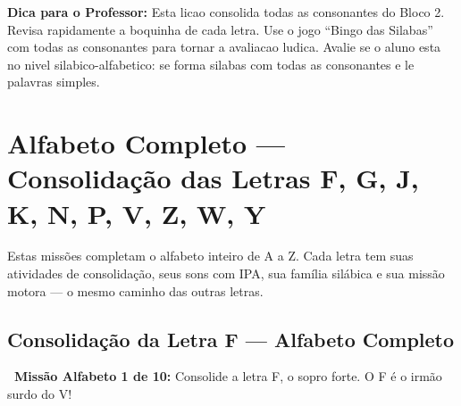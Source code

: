 \begin{dica}
\textbf{Dica para o Professor:} Esta licao consolida todas as consonantes do Bloco 2. Revisa rapidamente a boquinha de cada letra. Use o jogo ``Bingo das Silabas'' com todas as consonantes para tornar a avaliacao ludica. Avalie se o aluno esta no nivel silabico-alfabetico: se forma silabas com todas as consonantes e le palavras simples.
\end{dica}



\section{Alfabeto Completo --- Consolida\c{c}\~a{}o das Letras F, G, J, K, N, P, V, Z, W, Y}

\rotinasimples
{}

Estas miss\~o{}es completam o alfabeto inteiro de A a Z. Cada letra tem
suas atividades de consolida\c{c}\~a{}o, seus sons com IPA, sua fam\'ilia
sil\'abica e sua miss\~a{}o motora --- o mesmo caminho das outras letras.




\subsection*{Consolida\c{c}\~a{}o da Letra F --- Alfabeto Completo}


\begin{missao}
\textbf{\faGamepad~Miss\~a{}o Alfabeto 1 de 10:} Consolide a letra F, o sopro forte. O F \'e{} o irm\~a{}o surdo do V!
\end{missao}



